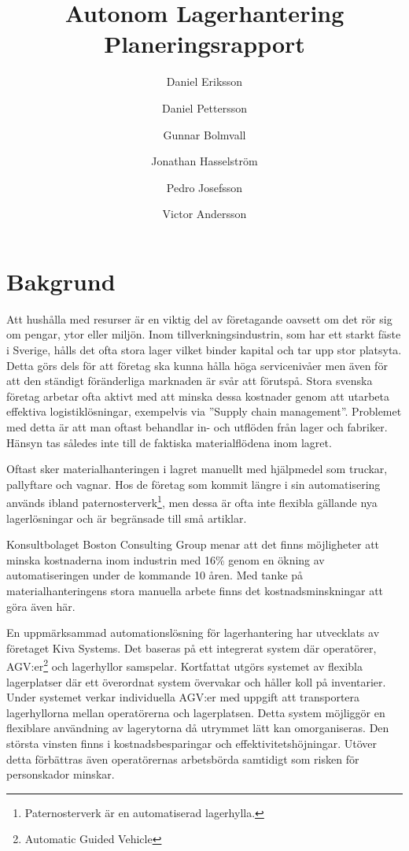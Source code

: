 \documentclass[a4paper,11pt]{article}
\author{Daniel Eriksson \and Daniel Pettersson \and Gunnar Bolmvall 
\and Jonathan Hasselström \and Pedro Josefsson \and Victor Andersson}
\title{Autonom Lagerhantering \\ Planeringsrapport}
\begin{document}
\maketitle


\section{Bakgrund}
Att hushålla med resurser är en viktig del av företagande oavsett om det
rör sig om pengar, ytor eller miljön. Inom tillverkningsindustrin, som har
ett starkt fäste i Sverige, hålls det ofta stora lager vilket binder
kapital och tar upp stor platsyta. Detta görs dels för att företag ska
kunna hålla höga servicenivåer men även för att den ständigt föränderliga
marknaden är svår att förutspå. Stora svenska företag arbetar ofta aktivt
med att minska dessa kostnader genom att utarbeta effektiva
logistiklösningar, exempelvis via ''Supply chain management''\cite{log}.
Problemet med detta är att man oftast behandlar in- och utflöden från lager
och fabriker. Hänsyn tas således inte till de faktiska materialflödena inom
lagret.

Oftast sker materialhanteringen i lagret manuellt med hjälpmedel som
truckar, pallyftare och vagnar. Hos de företag som kommit längre i sin
automatisering används ibland paternosterverk\footnote{Paternosterverk är
en automatiserad lagerhylla.}, men dessa är ofta inte flexibla gällande nya
lagerlösningar och är begränsade till små artiklar\cite{log}.
 
Konsultbolaget Boston Consulting Group menar att det finns möjligheter att
minska kostnaderna inom industrin med 16\% genom en ökning av
automatiseringen under de kommande 10 åren\cite{bcg}. Med tanke på
materialhanteringens stora manuella arbete finns det kostnadsminskningar
att göra även här.
 
En uppmärksammad automationslösning för lagerhantering har utvecklats av
företaget Kiva Systems. Det baseras på ett integrerat system där
operatörer, AGV:er\footnote{Automatic Guided Vehicle} och lagerhyllor
samspelar. Kortfattat utgörs systemet av flexibla lagerplatser där ett
överordnat system övervakar och håller koll på inventarier. Under systemet
verkar individuella AGV:er med uppgift att transportera lagerhyllorna
mellan operatörerna och lagerplatsen. Detta system möjliggör en flexiblare
användning av lagerytorna då utrymmet lätt kan omorganiseras\cite{kivasystems}.
Den största vinsten finns i kostnadsbesparingar och
effektivitetshöjningar. Utöver detta förbättras även operatörernas
arbetsbörda samtidigt som risken för personskador minskar\cite{truckar}. 
\end{document}
